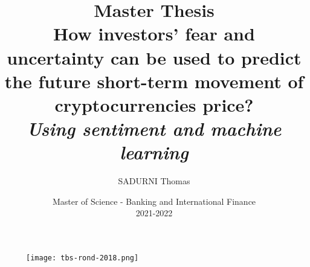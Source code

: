\documentclass{article}
\begin{document}
	\begin{figure}[t]
		\centering
		\texttt{[image: tbs-rond-2018.png]}
	\end{figure}
	
	\title{\vspace{0,5cm} Master Thesis \\ \vspace{0,5cm} \textbf{How investors’ fear and uncertainty can be used to predict the future short-term movement of cryptocurrencies price?}  \\ \textit{Using sentiment and machine learning\\}}
	
	\author{SADURNI Thomas}
	
	\date{\vspace{4.5cm} Master of Science - Banking and International Finance\\
		2021-2022 }
	
	\maketitle
	
	\newpage
	
\end{document}
